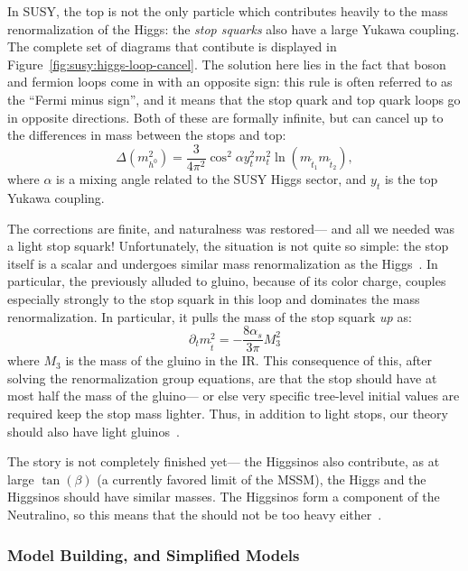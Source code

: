 In SUSY, the top is not the only particle which contributes heavily to the mass renormalization of the Higgs: the \textit{stop squarks} also have a large Yukawa coupling. The complete set of diagrams that contibute is displayed in Figure~\ref{fig:susy:higgs-loop-cancel}. The solution here lies in the fact that boson and fermion loops come in with an opposite sign: this rule is often referred to as the ``Fermi minus sign'', and it means that the stop quark and top quark loops go in opposite directions. Both of these are formally infinite, but can cancel up to the differences in mass between the stops and top: \cite{Martin1997}
%
\begin{equation}
\Delta(m_{h^0}^2) = \frac{3}{4\pi^2} \cos^2 \alpha y_t^2 m_t^2 \ln \left( m_{\tilde{t}_1} m_{\tilde{t}_2} \right),
\end{equation}
%
where $\alpha$ is a mixing angle related to the SUSY Higgs sector, and $y_t$ is the top Yukawa coupling.

The corrections are finite, and naturalness was restored--- and all we needed was a light stop squark! Unfortunately, the situation is not quite so simple: the stop itself is a scalar and undergoes similar mass renormalization as the Higgs~\cite{natural}. In particular, the previously alluded to gluino, because of its color charge, couples especially strongly to the stop squark in this loop and dominates the mass renormalization. In particular, it pulls the mass of the stop squark \textit{up} as:~\cite{natural}
%
\begin{equation}
\partial_t m_{\tilde{t}}^2 = - \frac{8\alpha_s}{3\pi} M_3^2
\end{equation}
%
where $M_3$ is the mass of the gluino in the IR. This consequence of this, after solving the renormalization group equations, are that the stop should have at most half the mass of the gluino--- or else very specific tree-level initial values are required keep the stop mass lighter. Thus, in addition to light stops, our theory should also have light gluinos~\cite{natural}.

The story is not completely finished yet--- the Higgsinos also contribute, as at large $\tan(\beta)$ (a currently favored limit of the MSSM), the Higgs and the Higgsinos should have similar masses. The Higgsinos form a component of the Neutralino, so this means that the \lsp should not be too heavy either~\cite{natural}.


\subsubsection{Model Building, and Simplified Models}

